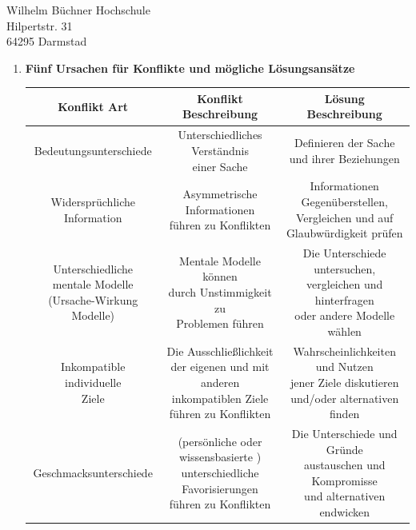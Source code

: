\documentclass[
    version=last,           %
    DIV=13,                 %
    BCOR=0mm,               %
    paper=a4,               %
    fontsize=12pt,          %
    firsthead=on,           %
    firstfoot=on,           %
    pagenumber=on,i         %
    parskip=half,           %
    enlargefirstpage=,      %
    firsthead=on,           %
    fromrule=afteraddress,  %
    priority=off,           %
    backaddress=true,       %
    refline=dateright,      %
	fromalign=right,	    %
    fromemail=on,i          %
    fromurl=on,             %
    frombank=on,
    fromphone=on,           %
    frommobilephone=on      %
    fromlogo=on,            %
    addrfield=on,           %
    subject=untitled,  %
    foldmarks=off,          %
    numericaldate=off,      %
	pagenumber=right,	        %
	parskip=half,	        %
    headsep=false,          %
    footsepline=true,       %
    foldmarks=off,		    %
	]{scrlttr2}
\begin{document}
\begin{letter} {Wilhelm Büchner Hochschule \\
Hilpertstr. 31\\
64295 Darmstad}
\begin{itemize}
\begin{enumerate}
            \vspace{1cm}
            \item \textbf{ Fünf Ursachen für Konflikte und mögliche Lösungsansätze }
            \vspace{0.5cm}
                \\
            \begin{tabular}{|c|c|c| }
            \hline  \textbf{ Konflikt Art} & \textbf{ Konflikt Beschreibung}
                                           & \textbf{Lösung Beschreibung}\\
                \hline Bedeutungsunterschiede & \thead{Unterschiedliches Verständnis
                \\ einer Sache } & \thead{ Definieren der Sache \\ und ihrer Beziehungen }\\
                \hline \thead{Widersprüchliche \\ Information } & \thead{
                Asymmetrische Informationen \\ führen zu Konflikten } & \thead{
                Informationen Gegenüberstellen, \\ Vergleichen und auf
             \\Glaubwürdigkeit prüfen} \\
             \hline \thead{Unterschiedliche \\ mentale Modelle \\ (Ursache-Wirkung Modelle) }
             & \thead {Mentale Modelle können \\ durch Unstimmigkeit zu \\ Problemen führen }  &
             \thead{ Die Unterschiede untersuchen, \\ vergleichen und
                 hinterfragen \\ oder andere Modelle wählen } \\
                \hline \thead{ Inkompatible individuelle \\ Ziele} & \thead { Die
                Ausschließlichkeit \\ der eigenen und mit anderen \\ inkompatiblen
                Ziele \\ führen zu Konflikten } & \thead{ Wahrscheinlichkeiten und Nutzen \\
                jener Ziele diskutieren \\ und/oder alternativen finden } \\
                \hline Geschmacksunterschiede &  \thead{(persönliche oder
                wissensbasierte ) \\ unterschiedliche Favorisierungen  \\ führen
            zu Konflikten } & \thead { Die Unterschiede und Gründe \\
        austauschen und Kompromisse \\ und alternativen endwicken} \\
            \hline


\end{tabular}
\end{enumerate}
\end{itemize}
\end{letter}
\end{document}
